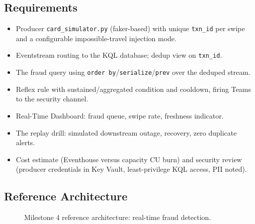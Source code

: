\subsection*{Requirements}
\begin{itemize}
    \item Producer \texttt{card\_simulator.py} (faker-based) with unique \texttt{txn\_id} per swipe and a configurable impossible-travel injection mode.
    \item Eventstream routing to the KQL database; dedup view on \texttt{txn\_id}.
    \item The fraud query using \texttt{order by}/\texttt{serialize}/\texttt{prev} over the deduped stream.
    \item Reflex rule with sustained/aggregated condition and cooldown, firing Teams to the security channel.
    \item Real-Time Dashboard: fraud queue, swipe rate, freshness indicator.
    \item The replay drill: simulated downstream outage, recovery, zero duplicate alerts.
    \item Cost estimate (Eventhouse versus capacity CU burn) and security review (producer credentials in Key Vault, least-privilege KQL access, PII noted).
\end{itemize}

\subsection*{Reference Architecture}
\begin{figure}[H]
    \centering
    \caption{Milestone 4 reference architecture: real-time fraud detection.}
    \label{fig:chapter16-capstone-architecture}
\end{figure}

